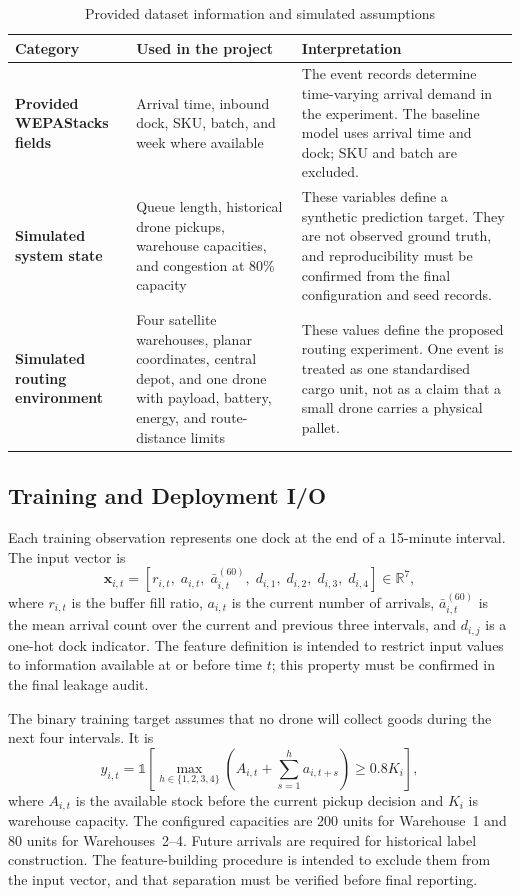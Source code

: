 \documentclass[10pt]{article}
\newcommand{\R}{\mathbb{R}}
\begin{document}
\begin{table}[H]
\centering
\caption{Provided dataset information and simulated assumptions}
\label{tab:real-simulated}
\small
\begin{tabularx}{\textwidth}{>{\bfseries}p{}YY}
\toprule
Category & Used in the project & Interpretation \\
\midrule
Provided WEPAStacks fields & Arrival time, inbound dock, SKU, batch, and week where available & The event records determine time-varying arrival demand in the experiment. The baseline model uses arrival time and dock; SKU and batch are excluded. \\
Simulated system state & Queue length, historical drone pickups, warehouse capacities, and congestion at 80\% capacity & These variables define a synthetic prediction target. They are not observed ground truth, and reproducibility must be confirmed from the final configuration and seed records. \\
Simulated routing environment & Four satellite warehouses, planar coordinates, central depot, and one drone with payload, battery, energy, and route-distance limits & These values define the proposed routing experiment. One event is treated as one standardised cargo unit, not as a claim that a small drone carries a physical pallet. \\
\bottomrule
\end{tabularx}
\end{table}

\subsection{Training and Deployment I/O}

Each training observation represents one dock at the end of a 15-minute interval. The input vector is
\begin{equation}
\mathbf{x}_{i,t} = [r_{i,t},\; a_{i,t},\; \bar{a}^{(60)}_{i,t},\; d_{i,1},\; d_{i,2},\; d_{i,3},\; d_{i,4}] \in \R^7,
\end{equation}
where $r_{i,t}$ is the buffer fill ratio, $a_{i,t}$ is the current number of arrivals, $\bar{a}^{(60)}_{i,t}$ is the mean arrival count over the current and previous three intervals, and $d_{i,j}$ is a one-hot dock indicator. The feature definition is intended to restrict input values to information available at or before time $t$; this property must be confirmed in the final leakage audit.

The binary training target assumes that no drone will collect goods during the next four intervals. It is
\begin{equation}
y_{i,t}=\mathbb{1}\!\left[\max_{h\in\{1,2,3,4\}}
\left(A_{i,t}+\sum_{s=1}^{h}a_{i,t+s}\right) \geq 0.8K_i\right],
\label{eq:target}
\end{equation}
where $A_{i,t}$ is the available stock before the current pickup decision and $K_i$ is warehouse capacity. The configured capacities are 200 units for Warehouse~1 and 80 units for Warehouses~2--4. Future arrivals are required for historical label construction. The feature-building procedure is intended to exclude them from the input vector, and that separation must be verified before final reporting.
\end{document}
